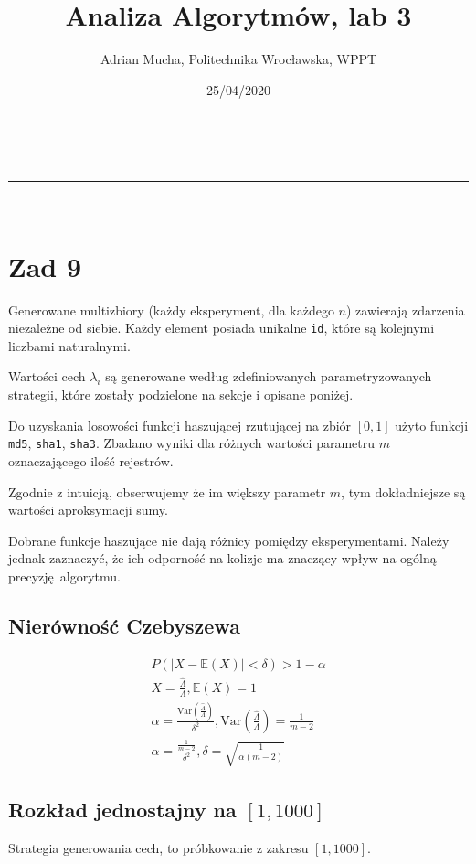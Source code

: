 \documentclass[a4paper,11pt]{article}
\makeatletter
\newcommand{\linia}{\rule{\linewidth}{0.5pt}}
\theoremstyle{mytheor}
\renewcommand{\maketitle}{
\begin{center}
\vspace{2ex}
{\huge \textsc{\@title}}
\vspace{1ex}
\\
\linia\\
\@author \hfill \@date
\vspace{4ex}
\end{center}
}
\makeatother
\begin{document}
\title{Analiza Algorytmów, lab 3}

\author{Adrian Mucha, Politechnika Wrocławska, WPPT}

\date{25/04/2020}

\maketitle

\section*{Zad 9}

Generowane multizbiory (każdy eksperyment, dla każdego $n$) zawierają zdarzenia niezależne od siebie. Każdy element posiada unikalne \texttt{id}, które są kolejnymi liczbami naturalnymi.

Wartości cech $\lambda_i$ są generowane według zdefiniowanych parametryzowanych strategii, które zostały podzielone na sekcje i opisane poniżej.

Do uzyskania losowości funkcji haszującej rzutującej na zbiór $[0, 1]$ użyto funkcji \texttt{md5}, \texttt{sha1}, \texttt{sha3}. Zbadano wyniki dla różnych wartości parametru $m$ oznaczającego ilość rejestrów.

Zgodnie z intuicją, obserwujemy że im większy parametr $m$, tym dokładniejsze są wartości aproksymacji sumy.

Dobrane funkcje haszujące nie dają różnicy pomiędzy eksperymentami. Należy jednak zaznaczyć, że ich odporność na kolizje ma znaczący wpływ na ogólną precyzję algorytmu.

\subsection*{Nierówność Czebyszewa}
\begin{gather*}
    P(|X - \mathbb{E}(X)| < \delta) > 1 - \alpha \\
    X = \frac{\hat{\Lambda}}{\Lambda}, \mathbb{E}(X) = 1 \\
    \alpha = \frac{\text{Var}(\frac{\hat{\Lambda}}{\Lambda})}{\delta^2}, 
    \text{Var}(\frac{\hat{\Lambda}}{\Lambda}) = \frac{1}{m - 2} \\
    \alpha = \frac{\frac{1}{m - 2}}{\delta^2}, 
    \delta = \sqrt{\frac{1}{\alpha(m - 2)}}
\end{gather*}


\subsection*{Rozkład jednostajny na $[1, 1000]$}
Strategia generowania cech, to próbkowanie z zakresu $[1, 1000]$.

\end{document}
